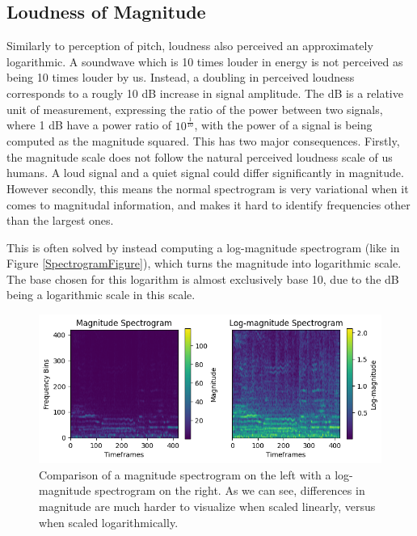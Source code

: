 \subsection{Loudness of Magnitude}

Similarly to perception of pitch, loudness also perceived an approximately logarithmic. A soundwave which is 10 times louder in energy is not perceived as being 10 times louder by us. Instead, a doubling in perceived loudness corresponds to a rougly 10 \gls{dB} increase in signal amplitude. The \acrlong{dB} is a relative unit of measurement, expressing the ratio of the power between two signals, where 1 \gls{dB} have a power ratio of $10^\frac{1}{10}$, with the power of a signal is being computed as the magnitude squared. This has two major consequences. Firstly, the magnitude scale does not follow the natural perceived loudness scale of us humans. A loud signal and a quiet signal could differ significantly in magnitude. However secondly, this means the normal spectrogram is very variational when it comes to magnitudal information, and makes it hard to identify frequencies other than the largest ones.

This is often solved by instead computing a log-magnitude spectrogram (like in Figure \ref{SpectrogramFigure}), which turns the magnitude into logarithmic scale. The base chosen for this logarithm is almost exclusively base 10, due to the \acrlong{dB} being a logarithmic scale in this scale.

\begin{figure}[H]
    \centering
    \hspace*{-1.0cm}
    \includegraphics[scale=1.0]{figures/spectrogramlogspectrogram}
    \caption{Comparison of a magnitude spectrogram on the left with a log-magnitude spectrogram on the right. As we can see, differences in magnitude are much harder to visualize when scaled linearly, versus when scaled logarithmically.}
    \label{SpectrogramLogspectrogramFigure}
\end{figure}

